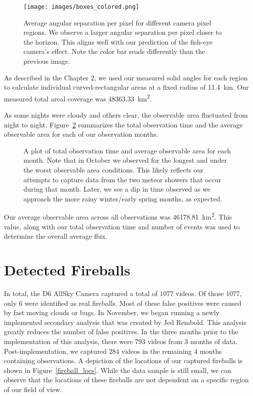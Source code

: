 \begin{figure}[ht!]
  \centering
  \texttt{[image: images/boxes\_colored.png]}
  \caption[Average angular separation per pixel for different camera pixel regions.]{Average angular separation per pixel for different camera pixel regions.  We observe a larger angular separation per pixel closer to the horizon.  This aligns well with our prediction of the fish-eye camera's effect. Note the color bar reads differently than the previous image.}
  \label{colorful}
\end{figure}

As described in the Chapter $2$, we used our measured solid angles for each region to calculate individual  curved-rectangular areas at a fixed radius of \SI{11.4}{\kilo\meter}.
Our measured total areal coverage was  \SI{48363.33}{\square\kilo\meter}.

As some nights were cloudy and others clear, the observable area fluctuated from night to night. 
Figure~\ref{time_area} summarizes the total observation time and the average observable area for each of our observation months. 

\begin{figure}[ht!]
  \centering
  \caption[A plot of total observation time and average observable area for each month.]{A plot of total observation time and average observable area for each month.
  Note that in October we observed for the longest and under the worst observable area conditions. 
  This likely reflects our attempts to capture data from the two meteor showers that occur during that month. 
  Later, we see a dip in time observed as we approach the more rainy winter/early spring months, as expected.}
  \label{time_area}
\end{figure}

Our average observable area across all observations was  \SI{46178.81}{\square\kilo\meter}.
This value, along with our total observation time and number of events was used to determine the overall average flux.

\section{Detected Fireballs}

In total, the D6 AllSky Camera captured a total of $1077$ videos.  
Of those $1077$, only $6$ were identified as real fireballs.
Most of these false positives were caused by fast moving clouds or bugs.
In November, we began running a newly implemented secondary analysis that was created by Jed Rembold.
This analysis greatly reduces the number of false positives.
In the three months prior to the implementation of this analysis, there were $793$ videos from $3$ months of data.
Post-implementation, we captured $284$ videos in the remaining $4$ months containing observations.
A depiction of the locations of our captured fireballs is shown in Figure~\ref{fireball_locs}.
While the data sample is still small, we can observe that the locations of these fireballs are not dependent on a specific region of our field of view.  


